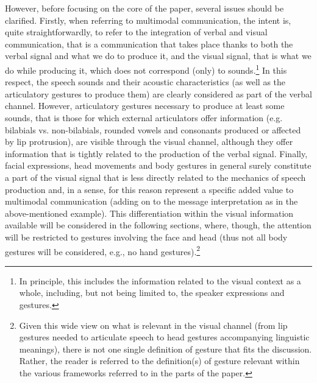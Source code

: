 \documentclass[output=paper]{langsci/langscibook}
\begin{document}
However, before focusing on the core of the paper, several issues should be clarified. Firstly, when referring to multimodal communication, the intent is, quite straightforwardly, to refer to the integration of verbal and visual communication, that is a communication that takes place thanks to both the verbal signal and what we do to produce it, and the visual signal, that is what we do while producing it, which does not correspond (only) to sounds.\footnote{\label{fn:gil:2}In principle, this includes the information related to the visual context as a whole, including, but not being limited to, the speaker expressions and gestures.} In this respect, the speech sounds and their acoustic characteristics (as well as the articulatory gestures to produce them) are clearly considered as part of the verbal channel. However, articulatory gestures necessary to produce at least some sounds, that is those for which external articulators offer information (e.g. bilabials vs. non-bilabials, rounded vowels and consonants produced or affected by lip protrusion), are visible through the visual channel, although they offer information that is tightly related to the production of the verbal signal. Finally, facial expressions, head movements and body gestures in general surely constitute a part of the visual signal that is less directly related to the mechanics of speech production and, in a sense, for this reason represent a specific added value to multimodal communication (adding on to the message interpretation as in the above-mentioned example). This differentiation within the visual information available will be considered in the following sections, where, though, the attention will be restricted to gestures involving the face and head (thus not all body gestures will be considered, e.g., no hand gestures).\footnote{Given this wide view on what is relevant in the visual channel (from lip gestures needed to articulate speech to head gestures accompanying linguistic meanings), there is not one single definition of gesture that fits the discussion. Rather, the reader is referred to the definition(s) of gesture relevant within the various frameworks referred to in the parts of the paper.} 
\end{document}
